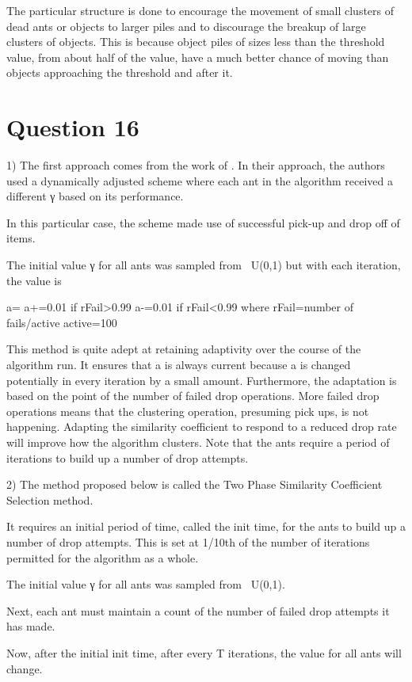 \documentclass[12pt]{article}
\begin{document}
The particular structure is done to encourage the movement of small clusters of dead ants or objects to larger piles and to discourage the breakup of large clusters of objects. This is because object piles of sizes less than the threshold value, from about half of the value, have a much better chance of moving than objects approaching the threshold and after it.
\section{Question 16}
1) The first approach comes from the work of \cite{Handl03ant-basedclustering}. In their approach, the authors used a dynamically adjusted scheme where each ant in the algorithm received a different γ based on its performance. 

	In this particular case, the scheme made use of successful pick-up and drop off of items. 

	The initial value γ for all ants was sampled from ~U(0,1) but with each iteration, the value is 

		a={
			a+=0.01 if rFail>0.99
			a-=0.01 if rFail<0.99
		}
		where rFail=number of fails/active {active=100}

	This method is quite adept at retaining adaptivity over the course of the algorithm run. It ensures that a is always current because a is changed potentially in every iteration by a small amount. Furthermore, the adaptation is based on the point of the number of failed drop operations. More failed drop operations means that the clustering operation, presuming pick ups, is not happening. Adapting the similarity coefficient to respond to a reduced drop rate will improve how the algorithm clusters. Note that the ants require a period of iterations to build up a number of drop attempts.
		
	2) The method proposed below is called the Two Phase Similarity Coefficient Selection method.

	It requires an initial period of time, called the init time, for the ants to build up a number of drop attempts. This is set at 1/10th  of the number of iterations permitted for the algorithm as a whole.

	The initial value γ for all ants was sampled from ~U(0,1).
	
	Next, each ant must maintain a count of the number of failed drop attempts it has made. 

	Now, after the initial init time, after every T iterations, the value for all ants will change.
\end{document}

